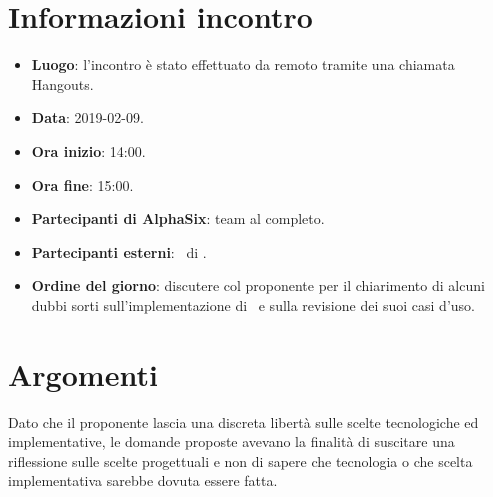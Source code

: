 \newcommand{\documento}{\VE}
\newcommand{\nomedocumentofisico}{VE\_2019-02-09.pdf}
\newcommand{\redazione}{\TG}
\newcommand{\verifica}{\SG}
\newcommand{\approvazione}{\CV}
\newcommand{\versione}{1.0.0}
\newcommand{\uso}{Esterno}
\newcommand{\destinateTo}{\TV, \\ & \RC, \\ & \II}
\newcommand{\datacreazione}{09 febbraio 2019}
\newcommand{\datamodifica}{11 febbraio 2019}
\newcommand{\stato}{Approvato}

\def\TABELLE{false}	%
\def\FIGURE{false} 	%






    

    
    
    \section{Informazioni incontro}
    	\begin{itemize}
    		\item \textbf{Luogo}: l'incontro è stato effettuato da remoto tramite una chiamata Hangouts.
    		\item \textbf{Data}: 2019-02-09.
    		\item \textbf{Ora inizio}: 14:00.
    		\item \textbf{Ora fine}: 15:00.
    		\item \textbf{Partecipanti di AlphaSix}: team al completo.
    		\item \textbf{Partecipanti esterni}: \DZ~di \II.
    		\item \textbf{Ordine del giorno}: discutere col proponente per il chiarimento di alcuni dubbi sorti sull'implementazione di \progetto~e sulla revisione dei suoi casi d'uso.
    	\end{itemize}
    
    \section{Argomenti}
    	Dato che il proponente lascia una discreta libertà sulle scelte tecnologiche ed implementative, le domande proposte avevano la finalità di suscitare una riflessione sulle scelte progettuali e non di sapere che tecnologia o che scelta implementativa sarebbe dovuta essere fatta.
    	
